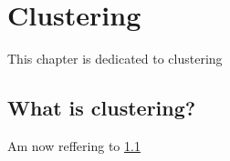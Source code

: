 \chapter{Clustering}
\label {chap:clustering}

This chapter is dedicated to clustering

\section{What is clustering?}
\label{sec:clustering_question}

Am now reffering to \ref{sec:clustering_question}